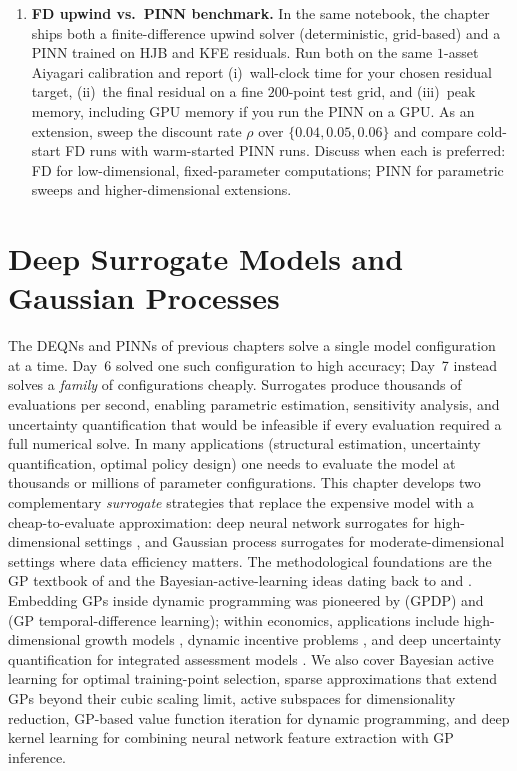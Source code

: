 \documentclass[11pt,a4paper]{report}
\begin{document}
\begin{enumerate}[itemsep=4pt, leftmargin=*]
\item\label{ex:ch8:7} \textbf{FD upwind vs.\ PINN benchmark.}  In the same notebook, the chapter ships both a finite-difference upwind solver (deterministic, grid-based) and a PINN trained on HJB and KFE residuals.  Run both on the same $1$-asset Aiyagari calibration and report (i)~wall-clock time for your chosen residual target, (ii)~the final residual on a fine $200$-point test grid, and (iii)~peak memory, including GPU memory if you run the PINN on a GPU.  As an extension, sweep the discount rate $\rho$ over $\{0.04, 0.05, 0.06\}$ and compare cold-start FD runs with warm-started PINN runs.  Discuss when each is preferred: FD for low-dimensional, fixed-parameter computations; PINN for parametric sweeps and higher-dimensional extensions.
\end{enumerate}


\chapter{Deep Surrogate Models and Gaussian Processes}
\label{ch:gp}

The DEQNs and PINNs of previous chapters solve a single model configuration at a time.  Day~6 solved one such configuration to high accuracy; Day~7 instead solves a \emph{family} of configurations cheaply.  Surrogates produce thousands of evaluations per second, enabling parametric estimation, sensitivity analysis, and uncertainty quantification that would be infeasible if every evaluation required a full numerical solve.  In many applications (structural estimation, uncertainty quantification, optimal policy design) one needs to evaluate the model at thousands or millions of parameter configurations.  This chapter develops two complementary \emph{surrogate} strategies that replace the expensive model with a cheap-to-evaluate approximation: deep neural network surrogates for high-dimensional settings \citep{chen2025Deep}, and Gaussian process surrogates for moderate-dimensional settings where data efficiency matters.  The methodological foundations are the GP textbook of \citet{Rasmussen:2005:GPM:1162254} and the Bayesian-active-learning ideas dating back to \citet{mackay1992information} and \citet{krause2008near}.  Embedding GPs inside dynamic programming was pioneered by \citet{deisenroth2009gaussian} (GPDP) and \citet{engel2005reinforcement} (GP temporal-difference learning); within economics, applications include high-dimensional growth models \citep{SCHEIDEGGER201968}, dynamic incentive problems \citep{rennerscheidegger_2018}, and deep uncertainty quantification for integrated assessment models \citep{friedlDeep2023}.  We also cover Bayesian active learning for optimal training-point selection, sparse approximations \citep{titsias2009variational, hensman2013gaussian} that extend GPs beyond their cubic scaling limit, active subspaces for dimensionality reduction, GP-based value function iteration for dynamic programming, and deep kernel learning for combining neural network feature extraction with GP inference.
\end{document}
